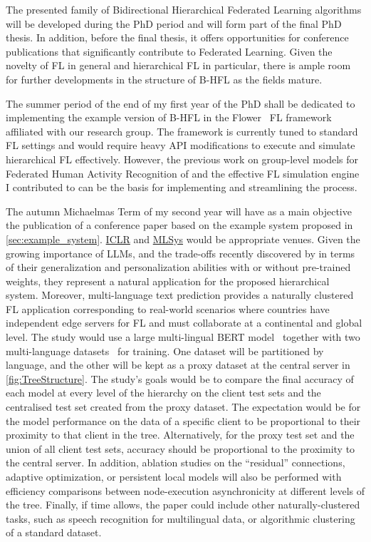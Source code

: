 The presented family of Bidirectional Hierarchical Federated Learning algorithms will be developed during the PhD period and will form part of the final PhD thesis. In addition, before the final thesis, it offers opportunities for conference publications that significantly contribute to Federated Learning. Given the novelty of FL in general and hierarchical FL in particular, there is ample room for further developments in the structure of B-HFL as the fields mature.

The summer period of the end of my first year of the PhD shall be dedicated to implementing the example version of B-HFL in the Flower~\citep{Flower} FL framework affiliated with our research group. The framework is currently tuned to standard FL settings and would require heavy API modifications to execute and simulate hierarchical FL effectively. However, the previous work on group-level models for Federated Human Activity Recognition of \citet{OperaWorkshop} and the effective FL simulation engine I contributed to can be the basis for implementing and streamlining the process.

The autumn Michaelmas Term of my second year will have as a main objective the publication of a conference paper based on the example system proposed in \cref{sec:example_system}. \href{https://iclr.cc/}{ICLR} and \href{https://mlsys.org/}{MLSys} would be appropriate venues. Given the growing importance of LLMs, and the trade-offs recently discovered by \citet{PersonalisationGeneralisationTradeoff} in terms of their generalization and personalization abilities with or without pre-trained weights, they represent a natural application for the proposed hierarchical system. Moreover, multi-language text prediction provides a naturally clustered FL application corresponding to real-world scenarios where countries have independent edge servers for FL and must collaborate at a continental and global level. The study would use a large multi-lingual BERT model~\citep{RoBERTA} together with two multi-language datasets~\citep[e.g., ][]{XGLUE,mC4} for training. One dataset will be partitioned by language, and the other will be kept as a proxy dataset at the central server in \cref{fig:TreeStructure}. The study's goals would be to compare the final accuracy of each model at every level of the hierarchy on the client test sets and the centralised test set created from the proxy dataset. The expectation would be for the model performance on the data of a specific client to be proportional to their proximity to that client in the tree. Alternatively, for the proxy test set and the union of all client test sets, accuracy should be proportional to the proximity to the central server. In addition, ablation studies on the ``residual'' connections, adaptive optimization, or persistent local models will also be performed with efficiency comparisons between node-execution asynchronicity at different levels of the tree.   Finally, if time allows, the paper could include other naturally-clustered tasks, such as speech recognition for multilingual data, or algorithmic clustering of a standard dataset.

